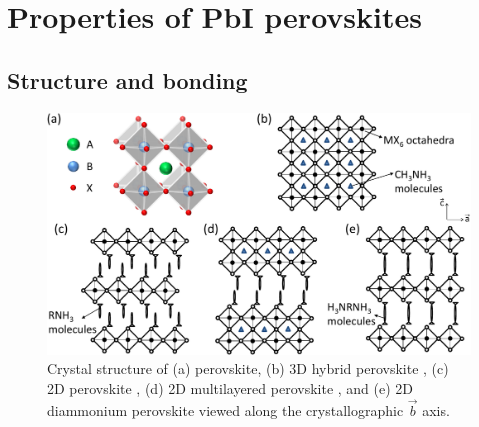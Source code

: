 \section{Properties of PbI perovskites}
\subsection{Structure and bonding}
\begin{figure}[h!] 
\centering    
\includegraphics[width=\textwidth]{Fig3}
\caption[Crystal structure of (a)  perovskite, (b) 3D hybrid perovskite, (c) 2D hybrid perovskite, (d) 2D multilayered perovskite, and (e) 2D diammonium perovskite viewed along the crystallographic $\vec{b}$ axis.]{Crystal structure of (a)  perovskite, (b) 3D hybrid perovskite , (c) 2D perovskite , (d) 2D multilayered perovskite , and (e) 2D diammonium perovskite  viewed along the crystallographic $\vec{b}$ axis.}
\label{2Fig3}
\end{figure}
